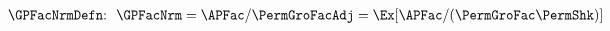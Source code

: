   \begin{align}
\text{{\GPFacNrmDefn}:~~}    \GPFacNrm  & = \APFac/\PermGroFacAdj = \Ex[\APFac/(\PermGroFac\PermShk)]  \phantom{\text{{\GPFNrm}:~~}} \label{eq:GPFNrm}
  \end{align}
